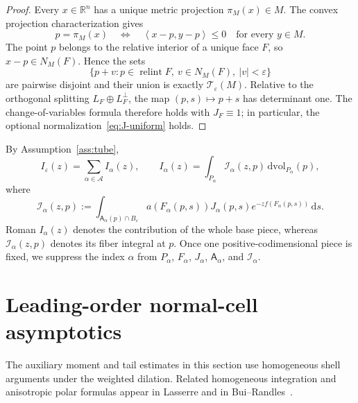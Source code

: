 \documentclass[11pt]{amsart}
\numberwithin{equation}{section}
\theoremstyle{definition}
\theoremstyle{remark}
\DeclareMathOperator{\relint}{relint}
\newcommand{\R}{\mathbb{R}}
\newcommand{\dd}{\,\mathrm{d}}
\newcommand{\dvol}{\,\mathrm{dvol}}
\newcommand{\eps}{\varepsilon}
\newcommand{\cA}{\mathcal{A}}
\newcommand{\cT}{\mathcal{T}}
\newcommand{\cI}{\mathcal{I}}
\newcommand{\Afib}{\mathsf{A}}
\newcommand{\inner}[2]{\left\langle #1,#2\right\rangle}
\begin{document}
\begin{proof}
Every $x\in\R^n$ has a unique metric projection $\pi_M(x)\in M$.  The convex
projection characterization gives
\[
 p=\pi_M(x)
 \quad\Longleftrightarrow\quad
 \inner{x-p}{y-p}\le0\quad\text{for every }y\in M.
\]
The point $p$ belongs to the relative interior of a unique face $F$, so
$x-p\in N_M(F)$.  Hence the sets
\[
 \{p+v:p\in\relint F,\ v\in N_M(F),\ |v|<\eps\}
\]
are pairwise disjoint and their union is exactly $\cT_\eps(M)$.  Relative to
the orthogonal splitting $L_F\oplus L_F^\perp$, the map $(p,s)\mapsto p+s$
has determinant one.  The change-of-variables formula therefore holds with
$J_F\equiv1$; in particular, the optional normalization~\eqref{eq:J-uniform} holds.
\end{proof}

By Assumption~\ref{ass:tube},
\begin{equation}\label{eq:sum-pieces}
  I_\eps(z)=\sum_{\alpha\in\cA}I_\alpha(z),
  \qquad
  I_\alpha(z)=\int_{P_\alpha}\cI_\alpha(z,p)\dvol_{P_\alpha}(p),
\end{equation}
where
\begin{equation}\label{eq:fiber-integral}
  \cI_\alpha(z,p)
  :=\int_{\Afib_\alpha(p)\cap B_\eps}
  a(F_\alpha(p,s))J_\alpha(p,s)e^{-zf(F_\alpha(p,s))}\dd s.
\end{equation}
Roman $I_\alpha(z)$ denotes the contribution of the whole base piece,
whereas $\cI_\alpha(z,p)$ denotes its fiber integral at $p$.  Once one
positive-codimensional piece is fixed, we suppress the index $\alpha$ from
$P_\alpha$, $F_\alpha$, $J_\alpha$, $\Afib_\alpha$, and $\cI_\alpha$.

\section{Leading-order normal-cell asymptotics}\label{sec:leading}

The auxiliary moment and tail estimates in this section use homogeneous shell
arguments under the weighted dilation.  Related homogeneous integration and anisotropic polar
formulas appear in Lasserre and in Bui--Randles~\cite{Lasserre,BuiRandles}.
\end{document}
